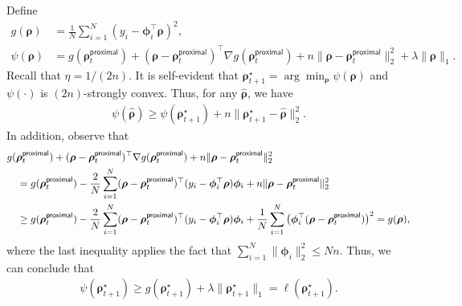 \documentclass[english]{article}
\begin{document}
Define
%
\begin{align*}
g({\bm \rho}) &= \frac1N \sum_{i=1}^N(y_i - {\bm \phi}_i^{\top}{\bm \rho})^2 , \\
\psi({\bm \rho}) &= g({\bm \rho}_t^{\mathsf{proximal}}) + ({\bm \rho} - {\bm \rho}_t^{\mathsf{proximal}})^{\top}\nabla g({\bm \rho}_t^{\mathsf{proximal}}) + n\|{\bm \rho} - {\bm \rho}_t^{\mathsf{proximal}}\|_2^2 + \lambda\|{\bm \rho}\|_1.
\end{align*}
%
Recall that $\eta = 1/(2n)$.
It is self-evident that ${\bm \rho}_{t+1}^{\star} = \arg\min_{\bm{\rho}} \psi({\bm \rho})$ and $\psi(\cdot)$ is $(2n)$-strongly convex.
Thus, for any $\widehat{\bm \rho}$, we have
%
\begin{align}\label{eq:proof-eq-PGD-temp-1}
\psi(\widehat{\bm \rho})\ge \psi({\bm \rho}_{t+1}^{\star}) + n\|{\bm \rho}_{t+1}^{\star} - \widehat{\bm \rho}\|_2^2.
\end{align}
%
In addition, observe that
%
\begin{align*}
& g({\bm \rho}_t^{\mathsf{proximal}}) + ({\bm \rho} - {\bm \rho}_t^{\mathsf{proximal}})^{\top}\nabla g({\bm \rho}_t^{\mathsf{proximal}}) + n\|{\bm \rho} - {\bm \rho}_t^{\mathsf{proximal}}\|_2^2 \notag\\
&\quad= g({\bm \rho}_t^{\mathsf{proximal}}) - \frac2N\sum_{i=1}^N({\bm \rho} - {\bm \rho}_t^{\mathsf{proximal}})^{\top}(y_i - {\bm \phi}_i^{\top}{\bm \rho}){\bm \phi}_i + n\|{\bm \rho} - {\bm \rho}_t^{\mathsf{proximal}}\|_2^2\notag\\
&\quad \ge g({\bm \rho}_t^{\mathsf{proximal}}) - \frac2N\sum_{i=1}^N({\bm \rho} - {\bm \rho}_t^{\mathsf{proximal}})^{\top}(y_i - {\bm \phi}_i^{\top}{\bm \rho}){\bm \phi}_i + \frac1N\sum_{i=1}^N\big({\bm \phi}_i^{\top}({\bm \rho} - {\bm \rho}_t^{\mathsf{proximal}})\big)^2=g({\bm \rho}),
\end{align*}
%
where the last inequality applies the fact that $\sum_{i=1}^N\|{\bm \phi}_i\|_2^2 \le Nn$.
Thus, we can conclude that
\begin{align}\label{eq:proof-eq-PGD-temp-2}
\psi({\bm \rho}_{t+1}^{\star})\ge g({\bm \rho}_{t+1}^{\star}) + \lambda \|{\bm \rho}_{t+1}^{\star}\|_1 = \ell ({\bm \rho}_{t+1}^{\star}).
\end{align}
%
\end{document}
